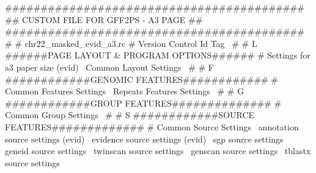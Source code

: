 \documentclass[11pt]{article}
\def\nwendcode{\endtrivlist \endgroup} %
\let\nwdocspar=\par                    %
\begin{document}
\nwenddocs{}\endmoddef
##########################################
##   CUSTOM FILE FOR GFF2PS - A3 PAGE   ##
##########################################
#
# chr22_masked_evid_a3.rc
#
\LA{}Version Control Id Tag~{\nwtagstyle{}}\RA{}
#
# L ######PAGE LAYOUT & PROGRAM OPTIONS######
#
\LA{}Settings for a3 paper size (evid)~{\nwtagstyle{}}\RA{}
\LA{}Common Layout Settings~{\nwtagstyle{}}\RA{}
#
# F ############GENOMIC FEATURES############
#
\LA{}Common Features Settings~{\nwtagstyle{}}\RA{}
\LA{}Repeats Features Settings~{\nwtagstyle{}}\RA{}
#
# G ############GROUP FEATURES##############
#
\LA{}Common Group Settings~{\nwtagstyle{}}\RA{}
#
# S ############SOURCE FEATURES#############
#
\LA{}Common Source Settings~{\nwtagstyle{}}\RA{}
\LA{}annotation source settings (evid)~{\nwtagstyle{}}\RA{}
\LA{}evidence source settings (evid)~{\nwtagstyle{}}\RA{}
\LA{}sgp source settings~{\nwtagstyle{}}\RA{}
\LA{}geneid source settings~{\nwtagstyle{}}\RA{}
\LA{}twinscan source settings~{\nwtagstyle{}}\RA{}
\LA{}genscan source settings~{\nwtagstyle{}}\RA{}
\LA{}tblastx source settings~{\nwtagstyle{}}\RA{}
\nwendcode{}\nwdocspar
\end{document}

